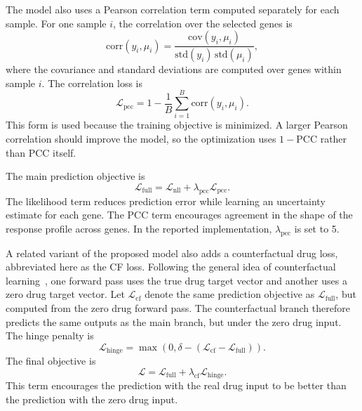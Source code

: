 \noindent The model also uses a Pearson correlation term computed separately for each sample. For one sample $i$, the correlation over the selected genes is
\begin{equation}
\label{eq:pcc_corr}
\mathrm{corr}\!\left(y_{i},\mu_{i}\right)=\frac{\mathrm{cov}(y_i,\mu_i)}{\mathrm{std}(y_i)\,\mathrm{std}(\mu_i)},
\end{equation}
where the covariance and standard deviations are computed over genes within sample $i$. The correlation loss is
\begin{equation}
\label{eq:pcc_loss}
\mathcal{L}_{\mathrm{pcc}} = 1-\frac{1}{B}\sum_{i=1}^{B}\mathrm{corr}\!\left(y_{i},\mu_{i}\right).
\end{equation}
This form is used because the training objective is minimized. A larger Pearson correlation should improve the model, so the optimization uses $1-\mathrm{PCC}$ rather than $\mathrm{PCC}$ itself.

\noindent The main prediction objective is
\begin{equation}
\mathcal{L}_{\mathrm{full}}=\mathcal{L}_{\mathrm{nll}}+\lambda_{\mathrm{pcc}}\mathcal{L}_{\mathrm{pcc}}.
\end{equation}
The likelihood term reduces prediction error while learning an uncertainty estimate for each gene. The PCC term encourages agreement in the shape of the response profile across genes. In the reported implementation, $\lambda_{\mathrm{pcc}}$ is set to 5.

\noindent A related variant of the proposed model also adds a counterfactual drug loss, abbreviated here as the CF loss. Following the general idea of counterfactual learning~\cite{guo2025counterfactual_graphs}, one forward pass uses the true drug target vector and another uses a zero drug target vector. Let $\mathcal{L}_{\mathrm{cf}}$ denote the same prediction objective as $\mathcal{L}_{\mathrm{full}}$, but computed from the zero drug forward pass. The counterfactual branch therefore predicts the same outputs as the main branch, but under the zero drug input. The hinge penalty is
\begin{equation}
\mathcal{L}_{\mathrm{hinge}}=\max\!\left(0,\delta-\left(\mathcal{L}_{\mathrm{cf}}-\mathcal{L}_{\mathrm{full}}\right)\right).
\end{equation}
The final objective is
\begin{equation}
\mathcal{L}=\mathcal{L}_{\mathrm{full}}+\lambda_{\mathrm{cf}}\mathcal{L}_{\mathrm{hinge}}.
\end{equation}
This term encourages the prediction with the real drug input to be better than the prediction with the zero drug input.

